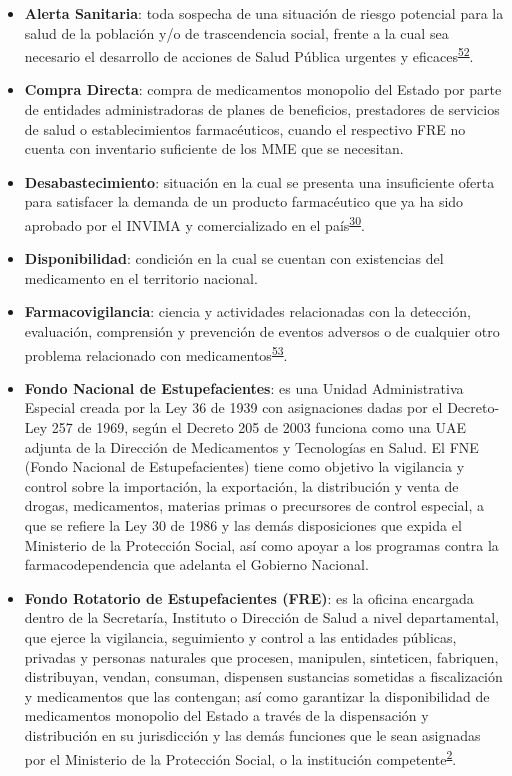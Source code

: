 \documentclass[
]{book}
\begin{document}
\begin{itemize}
\item
  \textbf{Alerta Sanitaria}: toda sospecha de una situación de riesgo potencial para la salud de la población y/o de trascendencia social, frente a la cual sea necesario el desarrollo de acciones de Salud Pública urgentes y eficaces\textsuperscript{\protect\hyperlink{ref-INVIMA2021-ALERTAS}{52}}.
\item
  \textbf{Compra Directa}: compra de medicamentos monopolio del Estado por parte de entidades administradoras de planes de beneficios, prestadores de servicios de salud o establecimientos farmacéuticos, cuando el respectivo FRE no cuenta con inventario suficiente de los MME que se necesitan.
\item
  \textbf{Desabastecimiento}: situación en la cual se presenta una insuficiente oferta para satisfacer la demanda de un producto farmacéutico que ya ha sido aprobado por el INVIMA y comercializado en el país\textsuperscript{\protect\hyperlink{ref-INVIMA2018-Desabast}{30}}.
\item
  \textbf{Disponibilidad}: condición en la cual se cuentan con existencias del medicamento en el territorio nacional.
\item
  \textbf{Farmacovigilancia}: ciencia y actividades relacionadas con la detección, evaluación, comprensión y prevención de eventos adversos o de cualquier otro problema relacionado con medicamentos\textsuperscript{\protect\hyperlink{ref-INVIMA2006-FV}{53}}.
\item
  \textbf{Fondo Nacional de Estupefacientes}: es una Unidad Administrativa Especial creada por la Ley 36 de 1939 con asignaciones dadas por el Decreto-Ley 257 de 1969, según el Decreto 205 de 2003 funciona como una UAE adjunta de la Dirección de Medicamentos y Tecnologías en Salud. El FNE (Fondo Nacional de Estupefacientes) tiene como objetivo la vigilancia y control sobre la importación, la exportación, la distribución y venta de drogas, medicamentos, materias primas o precursores de control especial, a que se refiere la Ley 30 de 1986 y las demás disposiciones que expida el Ministerio de la Protección Social, así como apoyar a los programas contra la farmacodependencia que adelanta el Gobierno Nacional.
\item
  \textbf{Fondo Rotatorio de Estupefacientes (FRE)}: es la oficina encargada dentro de la Secretaría, Instituto o Dirección de Salud a nivel departamental, que ejerce la vigilancia, seguimiento y control a las entidades públicas, privadas y personas naturales que procesen, manipulen, sinteticen, fabriquen, distribuyan, vendan, consuman, dispensen sustancias sometidas a fiscalización y medicamentos que las contengan; así como garantizar la disponibilidad de medicamentos monopolio del Estado a través de la dispensación y distribución en su jurisdicción y las demás funciones que le sean asignadas por el Ministerio de la Protección Social, o la institución competente\textsuperscript{\protect\hyperlink{ref-MSPS1479-2006}{2}}.

\end{itemize}
\end{document}
